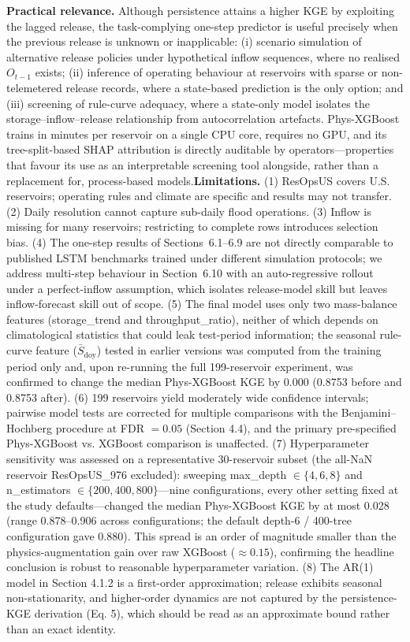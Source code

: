 \documentclass[journal]{ascelike-new}
\begin{document}
\textbf{Practical relevance.} Although persistence attains a higher KGE by exploiting the lagged release, the task-complying one-step predictor is useful precisely when the previous release is unknown or inapplicable: (i) scenario simulation of alternative release policies under hypothetical inflow sequences, where no realised $O_{t-1}$ exists; (ii) inference of operating behaviour at reservoirs with sparse or non-telemetered release records, where a state-based prediction is the only option; and (iii) screening of rule-curve adequacy, where a state-only model isolates the storage--inflow--release relationship from autocorrelation artefacts. Phys-XGBoost trains in minutes per reservoir on a single CPU core, requires no GPU, and its tree-split-based SHAP attribution is directly auditable by operators---properties that favour its use as an interpretable screening tool alongside, rather than a replacement for, process-based models.\n\n\textbf{Limitations.} (1) ResOpsUS covers U.S. reservoirs; operating rules and climate are specific and results may not transfer. (2) Daily resolution cannot capture sub-daily flood operations. (3) Inflow is missing for many reservoirs; restricting to complete rows introduces selection bias. (4) The one-step results of Sections~6.1--6.9 are not directly comparable to published LSTM benchmarks trained under different simulation protocols; we address multi-step behaviour in Section~6.10 with an auto-regressive rollout under a perfect-inflow assumption, which isolates release-model skill but leaves inflow-forecast skill out of scope. (5) The final model uses only two mass-balance features (storage\_trend and throughput\_ratio), neither of which depends on climatological statistics that could leak test-period information; the seasonal rule-curve feature ($\bar S_{\text{doy}}$) tested in earlier versions was computed from the training period only and, upon re-running the full 199-reservoir experiment, was confirmed to change the median Phys-XGBoost KGE by 0.000 (0.8753 before and 0.8753 after). (6) 199 reservoirs yield moderately wide confidence intervals; pairwise model tests are corrected for multiple comparisons with the Benjamini--Hochberg procedure at FDR $=0.05$ (Section 4.4), and the primary pre-specified Phys-XGBoost vs. XGBoost comparison is unaffected. (7) Hyperparameter sensitivity was assessed on a representative 30-reservoir subset (the all-NaN reservoir ResOpsUS\_976 excluded): sweeping max\_depth $\in \{4,6,8\}$ and n\_estimators $\in \{200,400,800\}$---nine configurations, every other setting fixed at the study defaults---changed the median Phys-XGBoost KGE by at most 0.028 (range 0.878--0.906 across configurations; the default depth-6 / 400-tree configuration gave 0.880). This spread is an order of magnitude smaller than the physics-augmentation gain over raw XGBoost ($\approx 0.15$), confirming the headline conclusion is robust to reasonable hyperparameter variation. (8) The AR(1) model in Section 4.1.2 is a first-order approximation; release exhibits seasonal non-stationarity, and higher-order dynamics are not captured by the persistence-KGE derivation (Eq. 5), which should be read as an approximate bound rather than an exact identity.
\end{document}
